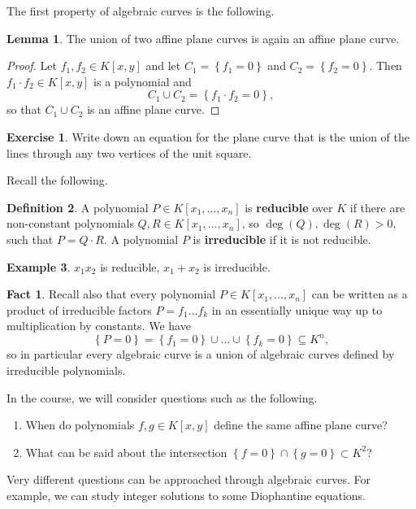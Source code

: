 \documentclass{article}
\newcommand{\rb}[1]{\left( #1 \right)}
\renewcommand{\sb}[1]{\left[ #1 \right]}
\newcommand{\cb}[1]{\left\{ #1 \right\}}
\theoremstyle{definition}\newtheorem{definition}{Definition}[section]
\theoremstyle{definition}\newtheorem{notation}[definition]{Notation}
\theoremstyle{definition}\newtheorem{remark}[definition]{Remark}
\theoremstyle{definition}\newtheorem{example}[definition]{Example}
\theoremstyle{definition}\newtheorem{fact}{Fact}
\theoremstyle{definition}\newtheorem{exercise}{Exercise}
\newtheorem{lemma}[definition]{Lemma}
\begin{document}
The first property of algebraic curves is the following.

\begin{lemma}
\label{lem:1.7}
The union of two affine plane curves is again an affine plane curve.
\end{lemma}

\begin{proof}
Let $ f_1, f_2 \in K\sb{x, y} $ and let $ C_1 = \cb{f_1 = 0} $ and $ C_2 = \cb{f_2 = 0} $. Then $ f_1 \cdot f_2 \in K\sb{x, y} $ is a polynomial and
$$ C_1 \cup C_2 = \cb{f_1 \cdot f_2 = 0}, $$
so that $ C_1 \cup C_2 $ is an affine plane curve.
\end{proof}

\begin{exercise}
Write down an equation for the plane curve that is the union of the lines through any two vertices of the unit square.
\end{exercise}

Recall the following.

\begin{definition}
A polynomial $ P \in K\sb{x_1, \dots, x_n} $ is \textbf{reducible} over $ K $ if there are non-constant polynomials $ Q, R \in K\sb{x_1, \dots, x_n} $, so $ \deg\rb{Q}, \deg\rb{R} > 0 $, such that $ P = Q \cdot R $. A polynomial $ P $ is \textbf{irreducible} if it is not reducible.
\end{definition}

\begin{example}
$ x_1x_2 $ is reducible, $ x_1 + x_2 $ is irreducible.
\end{example}

\begin{fact}
Recall also that every polynomial $ P \in K\sb{x_1, \dots, x_n} $ can be written as a product of irreducible factors $ P = f_1 \dots f_k $ in an essentially unique way up to multiplication by constants. We have
$$ \cb{P = 0} = \cb{f_1 = 0} \cup \dots \cup \cb{f_k = 0} \subseteq K^n, $$ so in particular every algebraic curve is a union of algebraic curves defined by irreducible polynomials.
\end{fact}

In the course, we will consider questions such as the following.
\begin{enumerate}
\item When do polynomials $ f, g \in K\sb{x, y} $ define the same affine plane curve?
\item What can be said about the intersection $ \cb{f = 0} \cap \cb{g = 0} \subset K^2 $?
\end{enumerate}
Very different questions can be approached through algebraic curves. For example, we can study integer solutions to some Diophantine equations.
\end{document}
